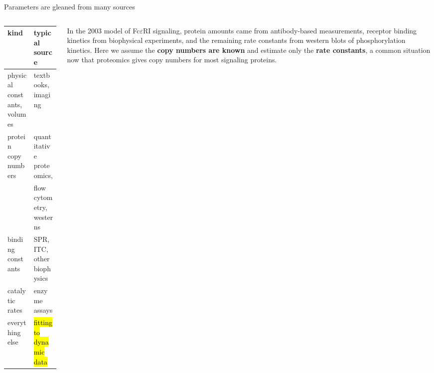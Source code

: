 \documentclass[aspectratio=169,10pt,t]{beamer}
\begin{document}
\begin{frame}{Parameters are gleaned from many sources}
  \begin{columns}[T]
    \begin{column}{0.5\textwidth}
      \small
      \begin{tabular}{@{}ll@{}}
        \toprule
        kind & typical source \\
        \midrule
        physical constants, volumes & textbooks, imaging \\
        protein copy numbers & quantitative proteomics, \\
                             & flow cytometry, westerns \\
        binding constants & SPR, ITC, other biophysics \\
        catalytic rates & enzyme assays \\
        everything else & \hl{fitting to dynamic data} \\
        \bottomrule
      \end{tabular}
    \end{column}
    \begin{column}{0.46\textwidth}
      \small
      In the 2003 model of Fc$\varepsilon$RI signaling, protein amounts came from
      antibody-based measurements, receptor binding kinetics from biophysical
      experiments, and the remaining rate constants from western blots of
      phosphorylation kinetics.
      \vskip2mm
      Here we assume the \textbf{copy numbers are known} and estimate only the
      \textbf{rate constants}, a common situation now that proteomics gives copy
      numbers for most signaling proteins.
    \end{column}
  \end{columns}
\end{frame}
\end{document}
